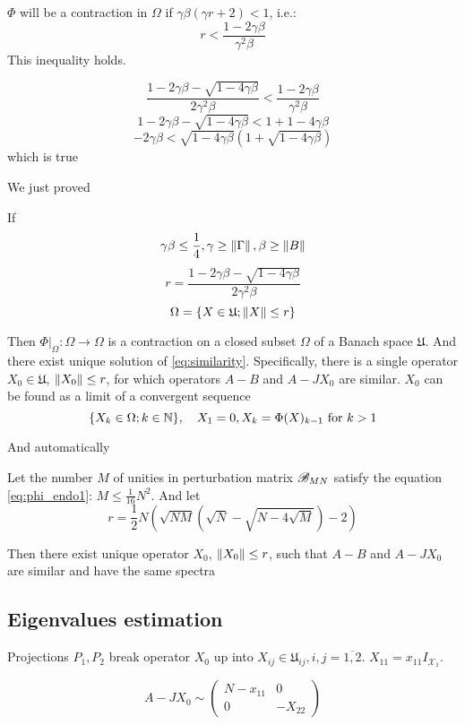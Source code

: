 \documentclass{article}
\begin{document}
\( \Phi \) will be a contraction in \( \Omega \) if \( \gamma\beta(\gamma r + 2) < 1 \), i.e.:
\[r < \frac{1-2\gamma\beta}{\gamma^2\beta}\]
This inequality holds.
\begin{TRIVIA}
        \[\frac{1-2\gamma\beta-\sqrt{1-4\gamma\beta}}{2\gamma^2\beta} < \frac{1-2\gamma\beta}{\gamma^2\beta}\]
        \[1-2\gamma\beta-\sqrt{1-4\gamma\beta} < 1+1-4\gamma\beta\]
        \[-2\gamma\beta<\sqrt{1-4\gamma\beta}\left(1+\sqrt{1-4\gamma\beta}\right)\]
        which is true
\end{TRIVIA}

We just proved
\begin{lemma}
    If
    \[\gamma\beta\leq\frac14, \gamma\geq\left\|{\Gamma}\right\|, \beta\geq\left\|{B}\right\|\]
    \[r = \frac{1 - 2\gamma\beta - \sqrt{1-4\gamma\beta}}{2 \gamma^2 \beta}\]
    \[\Omega = \{ X\in\mathfrak U; \left\|{X}\right\| \leq r \}\]

    Then
    \( \Phi|_{\Omega}:\Omega\to\Omega \) is a contraction on a closed subset \( \Omega \) of a Banach space \( \mathfrak U \).
    And there exist unique solution of \eqref{eq:similarity}.
    Specifically, there is a single operator \( X_0\in\mathfrak U \), \( \left\|{X_0}\right\| \leq r \),
    for which operators \( A-B \) and \( A-JX_0 \) are similar.
    \( X_0 \) can be found as a limit of a convergent sequence
    \[\{X_k\in\Omega; k\in\mathbb{N}\}, \quad X_1 = 0, X_k = \Phi(X)_{k-1} \text{ for } k>1\]
\end{lemma}
And automatically
\begin{thm}
    Let the number \( M \) of unities in perturbation matrix \( \mathscr{B}_{{M}{N}} \)
    satisfy the equation \eqref{eq:phi_endo1}: \( M \leq \frac{1}{16} N^2 \).
    And let
    \[ r = \frac12 N
        \left(
        \sqrt{NM}(\sqrt{N} - \sqrt{N-4\sqrt{M}}) - 2
        \right) \]

    Then there exist unique operator \( X_0 \), \( \left\|{X_0}\right\| \leq r \), such that \( A - B \) and \( A - J X_0 \) are similar
    and have the same spectra
\end{thm}

\subsection{Eigenvalues estimation}
Projections \( P_1, P_2 \) break operator \( X_0 \) up into \( X_{ij}\in\mathfrak U_{ij}, i,j=\overline{1,2} \).
\( X_{11} = x_{11} I_{\mathcal X_1} \).

\[
    A-JX_0 \sim
    \left(
\begin{array}{c|c}
    N-x_{11} & 0 \\
    \hline
    0        & -X_{22}
\end{array}
\right)
\]
\end{document}
